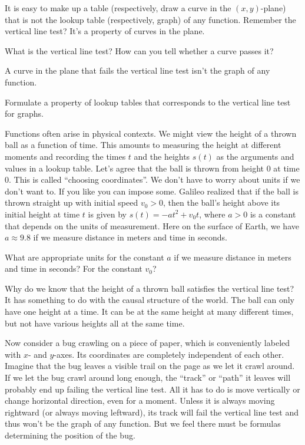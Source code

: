 \documentclass[justified]{tufte-handout}
\begin{document}
It is easy to make up a table (respectively, draw a curve in the $(x,y)$-plane) that is not the lookup table (respectively, graph) of any function. Remember the vertical line test? It's a property of curves in the plane.
\begin{marginnote}
	What is the vertical line test? How can you tell whether a curve passes it?
\end{marginnote}
A curve in the plane that fails the vertical line test isn't the graph of any function.
\begin{marginnote}
	Formulate a property of lookup tables that corresponds to the vertical line test for graphs.
\end{marginnote}
Functions often arise in physical contexts. We might view the height of a thrown ball as a function of time. This amounts to measuring the height at different moments and recording the times $t$ and the heights $s(t)$ as the arguments and values in a lookup table. Let's agree that the ball is thrown from height $0$ at time $0$. This is called ``choosing coordinates''. We don't have to worry about units if we don't want to. If you like you can impose some. Galileo realized that if the ball is thrown straight up with initial speed $v_0 > 0$, then the ball's height above its initial height at time $t$ is given by $s(t) = -at^2 + v_0 t$, where $a > 0$ is a constant that depends on the units of measurement. Here on the surface of Earth, we have $a \approx 9.8$ if we measure distance in meters and time in seconds.
\begin{marginnote}
 	What are appropriate units for the constant $a$ if we measure distance in meters and time in seconds? For the constant $v_0$?
\end{marginnote}
Why do we know that the height of a thrown ball satisfies the vertical line test? It has something to do with the causal structure of the world. The ball can only have one height at a time. It can be at the same height at many different times, but not have various heights all at the same time.

Now consider a bug crawling on a piece of paper, which is conveniently labeled with $x$- and $y$-axes. Its coordinates are completely independent of each other. Imagine that the bug leaves a visible trail on the page as we let it crawl around. If we let the bug crawl around long enough, the ``track'' or ``path'' it leaves will probably end up failing the vertical line test. All it has to do is move vertically or change horizontal direction, even for a moment. Unless it is always moving rightward (or always moving leftward), its track will fail the vertical line test and thus won't be the graph of any function. But we feel there must be formulas determining the position of the bug.
\end{document}
